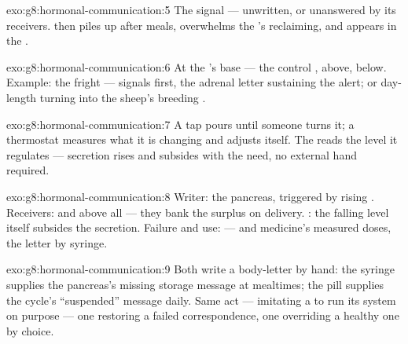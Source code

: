 \begin{solution}{exo:g8:hormonal-communication:5}
The  signal --- unwritten, or unanswered
by its receivers.  then piles up after meals,
overwhelms the 's reclaiming, and appears in the
.
\end{solution}

\begin{solution}{exo:g8:hormonal-communication:6}
At the 's base --- the control , 
above,  below. Example: the fright --- 
signals first, the adrenal letter sustaining the alert;
or day-length turning into the sheep's breeding .
\end{solution}

\begin{solution}{exo:g8:hormonal-communication:7}
A tap pours until someone turns it; a thermostat measures
what it is changing and adjusts itself. The  reads
the level it regulates --- secretion rises and subsides
with the need, no external hand required.
\end{solution}

\begin{solution}{exo:g8:hormonal-communication:8}
Writer: the pancreas, triggered by rising  .
Receivers:  and  above all --- they bank the
surplus on delivery. : the falling level itself
subsides the secretion. Failure and use:  ---
and medicine's measured doses, the letter by syringe.
\end{solution}

\begin{solution}{exo:g8:hormonal-communication:9}
Both write a body-letter by hand: the syringe supplies
the pancreas's missing storage message at mealtimes; the
pill supplies the cycle's ``suspended'' message daily.
Same act --- imitating a  to run its system on
purpose --- one restoring a failed correspondence, one
overriding a healthy one by choice.
\end{solution}

